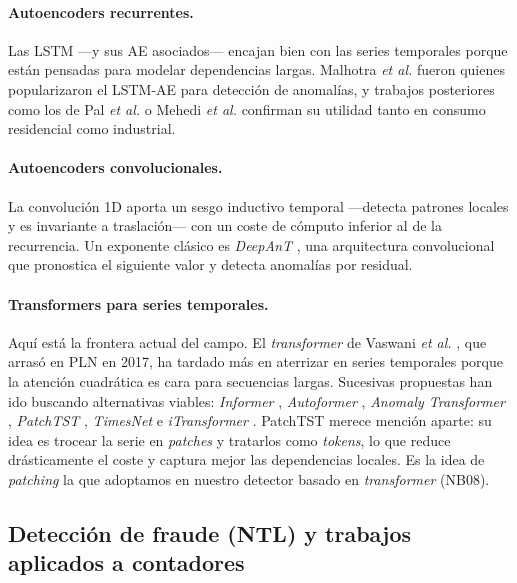 \paragraph{Autoencoders recurrentes.} Las LSTM \cite{hochreiter1997lstm} ---y sus AE asociados--- encajan bien con las series temporales porque están pensadas para modelar dependencias largas. Malhotra \emph{et al.} \cite{malhotra2016lstmae} fueron quienes popularizaron el LSTM-AE para detección de anomalías, y trabajos posteriores como los de Pal \emph{et al.} \cite{pal2023lstm} o Mehedi \emph{et al.} \cite{mehedi2024gruae} confirman su utilidad tanto en consumo residencial como industrial.

\paragraph{Autoencoders convolucionales.} La convolución 1D aporta un sesgo inductivo temporal ---detecta patrones locales y es invariante a traslación--- con un coste de cómputo inferior al de la recurrencia. Un exponente clásico es \textit{DeepAnT} \cite{munir2018deepant}, una arquitectura convolucional que pronostica el siguiente valor y detecta anomalías por residual.

\paragraph{Transformers para series temporales.} Aquí está la frontera actual del campo. El \textit{transformer} de Vaswani \emph{et al.} \cite{vaswani2017attention}, que arrasó en PLN en 2017, ha tardado más en aterrizar en series temporales porque la atención cuadrática es cara para secuencias largas. Sucesivas propuestas han ido buscando alternativas viables: \textit{Informer} \cite{zhou2021informer}, \textit{Autoformer} \cite{wu2021autoformer}, \textit{Anomaly Transformer} \cite{xu2022anomaly}, \textit{PatchTST} \cite{nie2023patchtst}, \textit{TimesNet} \cite{wu2023timesnet} e \textit{iTransformer} \cite{liu2024itransformer}. PatchTST merece mención aparte: su idea es trocear la serie en \textit{patches} y tratarlos como \textit{tokens}, lo que reduce drásticamente el coste y captura mejor las dependencias locales. Es la idea de \textit{patching} la que adoptamos en nuestro detector basado en \textit{transformer} (NB08).

\subsection{Detección de fraude (NTL) y trabajos aplicados a contadores}

